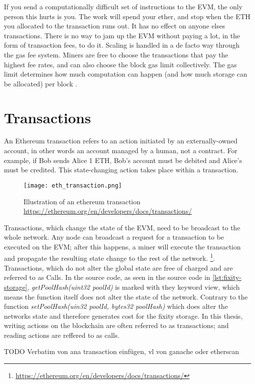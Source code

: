 If you send a computationally difficult set of instructions to the EVM, the only person this hurts is you. The work will spend your ether, and stop when the ETH you allocated to the transaction runs out. It has no effect on anyone elses transactions. There is no way to jam up the EVM without paying a lot, in the form of transaction fees, to do it. Scaling is handled in a de facto way through the gas fee system. Miners are free to choose the transactions that pay the highest fee rates, and can also choose the block gas limit collectively. The gas limit determines how much computation can happen (and how much storage can be allocated) per block \cite[60]{dannen2017introducing}. 
\section{Transactions}
An Ethereum transaction refers to an action initiated by an externally-owned account, in other words an account managed by a human, not a contract. For example, if Bob sends Alice 1 ETH, Bob's account must be debited and Alice's must be credited. This state-changing action takes place within a transaction. 
\begin{figure}[h]
    \caption{Illustration of an ethereum transaction \url{https://ethereum.org/en/developers/docs/transactions/}}
    \centering
    \texttt{[image: eth\_transaction.png]}
\end{figure}
Transactions, which change the state of the EVM, need to be broadcast to the whole network. Any node can broadcast a request for a transaction to be executed on the EVM; after this happens, a miner will execute the transaction and propagate the resulting state change to the rest of the network. \footnote{\url{https://ethereum.org/en/developers/docs/transactions/}}.
Transactions, which do not alter the global state are free of charged and are referred to as Calls. In the source code, as seen in the source code in \ref{lst:fixity-storage}, \textit{getPoolHash(uint32 poolId)} is marked with they keyword view, which means the function itself does not alter the state of the network. Contrary to the function \textit{setPoolHash(uin32 poolId, bytes32 poolHash)} which does alter the networks state and therefore generates cost for the fixity storage. In this thesis, writing actions on the blockchain are often referred to as transactions; and reading actions are reffered to as calls.

TODO Verbatim von ana transaction einfügen, vl von ganache oder etherscan

